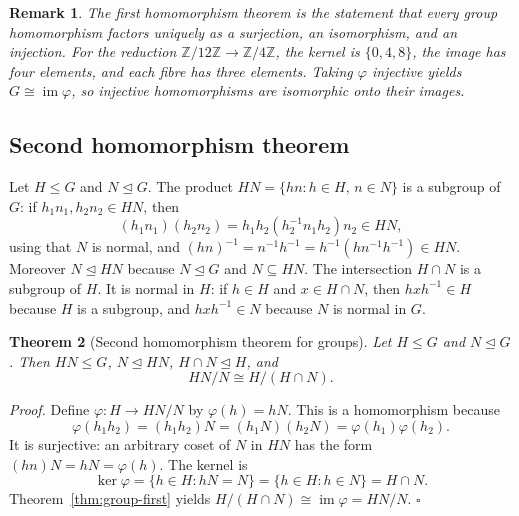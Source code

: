 \documentclass[11pt,letterpaper]{article}
\newcommand{\Z}{\mathbb{Z}}
\newcommand{\Map}[3]{#1 \colon #2 \to #3}
\newtheorem{theorem}{Theorem}
\newtheorem{remark}[theorem]{Remark}
\newenvironment{proof}{\noindent\textit{Proof.}}{\hfill\(\square\)}
\begin{document}
\begin{remark}
The first homomorphism theorem is the statement that every group homomorphism factors uniquely as a surjection, an isomorphism, and an injection. For the reduction \(\Z/12\Z\to\Z/4\Z\), the kernel is \(\{0,4,8\}\), the image has four elements, and each fibre has three elements. Taking \(\varphi\) injective yields \(G\cong\operatorname{im}\varphi\), so injective homomorphisms are isomorphic onto their images.
\end{remark}

\subsection{Second homomorphism theorem}

Let \(H\leq G\) and \(N\trianglelefteq G\). The product \(HN=\{hn:h\in H,\, n\in N\}\) is a subgroup of \(G\): if \(h_1 n_1, h_2 n_2\in HN\), then
\[
(h_1 n_1)(h_2 n_2)=h_1 h_2 (h_2^{-1} n_1 h_2) n_2\in HN,
\]
using that \(N\) is normal, and \((hn)^{-1}=n^{-1}h^{-1}=h^{-1}(h n^{-1} h^{-1})\in HN\). Moreover \(N\trianglelefteq HN\) because \(N\trianglelefteq G\) and \(N\subseteq HN\). The intersection \(H\cap N\) is a subgroup of \(H\). It is normal in \(H\): if \(h\in H\) and \(x\in H\cap N\), then \(h x h^{-1}\in H\) because \(H\) is a subgroup, and \(h x h^{-1}\in N\) because \(N\) is normal in \(G\).

\begin{theorem}[Second homomorphism theorem for groups]
\label{thm:group-second}
Let \(H\leq G\) and \(N\trianglelefteq G\). Then \(HN\leq G\), \(N\trianglelefteq HN\), \(H\cap N\trianglelefteq H\), and
\[
HN/N \cong H/(H\cap N).
\]
\end{theorem}

\begin{proof}
Define \(\Map{\varphi}{H}{HN/N}\) by \(\varphi(h)=hN\). This is a homomorphism because
\[
\varphi(h_1 h_2)=(h_1 h_2)N=(h_1 N)(h_2 N)=\varphi(h_1)\varphi(h_2).
\]
It is surjective: an arbitrary coset of \(N\) in \(HN\) has the form \((hn)N=hN=\varphi(h)\). The kernel is
\[
\ker\varphi=\{h\in H:hN=N\}=\{h\in H:h\in N\}=H\cap N.
\]
Theorem~\ref{thm:group-first} yields \(H/(H\cap N)\cong\operatorname{im}\varphi=HN/N\).
\end{proof}

\begin{center}
\end{center}
\end{document}
